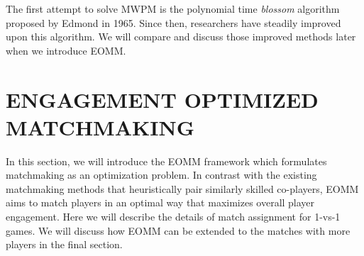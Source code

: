 The first attempt to solve MWPM is the polynomial time \textit{blossom} algorithm proposed by Edmond \cite{edmonds1965maximum,edmonds1965paths} in 1965. Since then, researchers have steadily improved upon this algorithm. We will compare and discuss those improved methods later when we introduce EOMM.

%
%





\section{ENGAGEMENT OPTIMIZED \\ MATCHMAKING}\label{sec:optimization}
In this section, we will introduce the EOMM framework which formulates matchmaking as an optimization problem. In contrast with the existing matchmaking methods that heuristically pair similarly skilled co-players, EOMM aims to match players in an optimal way that maximizes overall player engagement. Here we will describe the details of match assignment for 1-vs-1 games. We will discuss how EOMM can be extended to the matches with more players in the final section.

